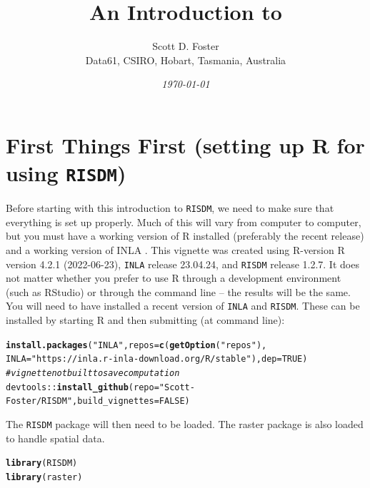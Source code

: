 \documentclass[article,shortnames,nojss]{jss}\usepackage[]{graphicx}\usepackage[]{xcolor}
\author{Scott D. Foster\\Data61, CSIRO, Hobart, Tasmania, Australia}
\title{An Introduction to \pkg{RISDM}}
\date{\itshape\today}
\makeatletter
\newcommand{\hlnum}[1]{\textcolor[rgb]{0.686,0.059,0.569}{#1}}%
\newcommand{\hlstr}[1]{\textcolor[rgb]{0.192,0.494,0.8}{#1}}%
\newcommand{\hlcom}[1]{\textcolor[rgb]{0.678,0.584,0.686}{\textit{#1}}}%
\newcommand{\hlopt}[1]{\textcolor[rgb]{0,0,0}{#1}}%
\newcommand{\hlstd}[1]{\textcolor[rgb]{0.345,0.345,0.345}{#1}}%
\newcommand{\hlkwc}[1]{\textcolor[rgb]{0.333,0.667,0.333}{#1}}%
\newcommand{\hlkwd}[1]{\textcolor[rgb]{0.737,0.353,0.396}{\textbf{#1}}}%
\newenvironment{kframe}{%
 \def\at@end@of@kframe{}%
 \ifinner\ifhmode%
  \def\at@end@of@kframe{\end{minipage}}%
  \begin{minipage}{\columnwidth}%
 \fi\fi%
 \def\FrameCommand##1{\hskip\@totalleftmargin \hskip-\fboxsep
 \colorbox{shadecolor}{##1}\hskip-\fboxsep
     \hskip-\linewidth \hskip-\@totalleftmargin \hskip\columnwidth}%
 \MakeFramed {\advance\hsize-\width
   \@totalleftmargin\z@ \linewidth\hsize
   \@setminipage}}%
 {\par\unskip\endMakeFramed%
 \at@end@of@kframe}
\newenvironment{knitrout}{}{} %
\makeatother
\begin{document}



\section*{First Things First (setting up R for using \texttt{RISDM})}

Before starting with this introduction to \texttt{RISDM}, we need to make sure that everything is set up properly. Much of this will vary from computer to computer, but you must have a working version of R installed (preferably the recent release) and a working version of INLA \citep{rue09}. This vignette was created using R-version R version 4.2.1 (2022-06-23), \texttt{INLA} release 23.04.24, and \texttt{RISDM} release 1.2.7. It does not matter whether you prefer to use R through a development environment (such as RStudio) or through the command line -- the results will be the same. You will need to have installed a recent version of \texttt{INLA} and \texttt{RISDM}. These can be installed by starting R and then submitting (at command line):
\begin{knitrout}
\color{fgcolor}\begin{kframe}
\begin{alltt}
\hlkwd{install.packages}\hlstd{(}\hlstr{"INLA"}\hlstd{,}\hlkwc{repos}\hlstd{=}\hlkwd{c}\hlstd{(}\hlkwd{getOption}\hlstd{(}\hlstr{"repos"}\hlstd{),}
                \hlkwc{INLA}\hlstd{=}\hlstr{"https://inla.r-inla-download.org/R/stable"}\hlstd{),} \hlkwc{dep}\hlstd{=}\hlnum{TRUE}\hlstd{)}
\hlcom{#vignette not built to save computation}
\hlstd{devtools}\hlopt{::}\hlkwd{install_github}\hlstd{(} \hlkwc{repo}\hlstd{=}\hlstr{"Scott-Foster/RISDM"}\hlstd{,} \hlkwc{build_vignettes}\hlstd{=}\hlnum{FALSE}\hlstd{)}
\end{alltt}
\end{kframe}
\end{knitrout}
The \texttt{RISDM} package will then need to be loaded. The raster package is also loaded to handle spatial data.
\begin{knitrout}
\color{fgcolor}\begin{kframe}
\begin{alltt}
\hlkwd{library}\hlstd{( RISDM)}
\hlkwd{library}\hlstd{( raster)}
\end{alltt}
\end{kframe}
\end{knitrout}
\end{document}
